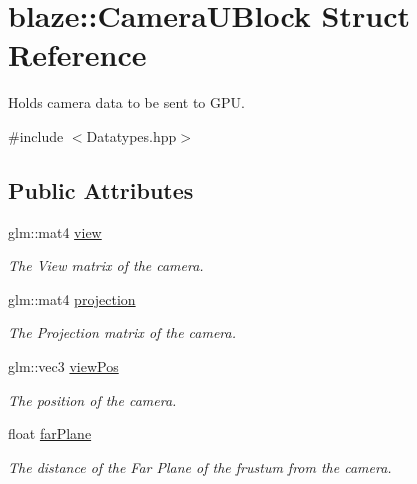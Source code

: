 \hypertarget{structblaze_1_1CameraUBlock}{}\section{blaze\+:\+:Camera\+U\+Block Struct Reference}
\label{structblaze_1_1CameraUBlock}


Holds camera data to be sent to G\+PU.  




{\ttfamily \#include $<$Datatypes.\+hpp$>$}

\subsection*{Public Attributes}
\begin{DoxyCompactItemize}
\item 
\mbox{\label{structblaze_1_1CameraUBlock_a1b00660f739bba711f966a0b5e5ce5ad}} 
glm\+::mat4 \hyperlink{structblaze_1_1CameraUBlock_a1b00660f739bba711f966a0b5e5ce5ad}{view}
\begin{DoxyCompactList}\small\item\em The View matrix of the camera. \end{DoxyCompactList}\item 
\mbox{\label{structblaze_1_1CameraUBlock_af9cdace8c1bf5dc83a1acdcd9eaa8d7a}} 
glm\+::mat4 \hyperlink{structblaze_1_1CameraUBlock_af9cdace8c1bf5dc83a1acdcd9eaa8d7a}{projection}
\begin{DoxyCompactList}\small\item\em The Projection matrix of the camera. \end{DoxyCompactList}\item 
\mbox{\label{structblaze_1_1CameraUBlock_ae51c1448432a6974a7986341c97a6c11}} 
glm\+::vec3 \hyperlink{structblaze_1_1CameraUBlock_ae51c1448432a6974a7986341c97a6c11}{view\+Pos}
\begin{DoxyCompactList}\small\item\em The position of the camera. \end{DoxyCompactList}\item 
\mbox{\label{structblaze_1_1CameraUBlock_a49c49b78eafa2669102fa584882be6b0}} 
float \hyperlink{structblaze_1_1CameraUBlock_a49c49b78eafa2669102fa584882be6b0}{far\+Plane}
\begin{DoxyCompactList}\small\item\em The distance of the Far Plane of the frustum from the camera. \end{DoxyCompactList}\end{DoxyCompactItemize}


